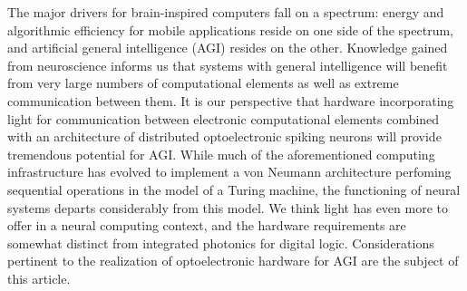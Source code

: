 \documentclass[twocolumn]{article}
\begin{document}
The major drivers for brain-inspired computers fall on a spectrum: energy and algorithmic efficiency for mobile applications reside on one side of the spectrum, and artificial general intelligence (AGI) resides on the other. Knowledge gained from neuroscience informs us that systems with general intelligence will benefit from very large numbers of computational elements as well as extreme communication between them. It is our perspective that hardware incorporating light for communication between electronic computational elements combined with an architecture of distributed optoelectronic spiking neurons will provide tremendous potential for AGI. While much of the aforementioned computing infrastructure has evolved to implement a von Neumann architecture perfoming sequential operations in the model of a Turing machine, the functioning of neural systems departs considerably from this model. We think light has even more to offer in a neural computing context, and the hardware requirements are somewhat distinct from integrated photonics for digital logic. Considerations pertinent to the realization of optoelectronic hardware for AGI are the subject of this article.
\end{document}
